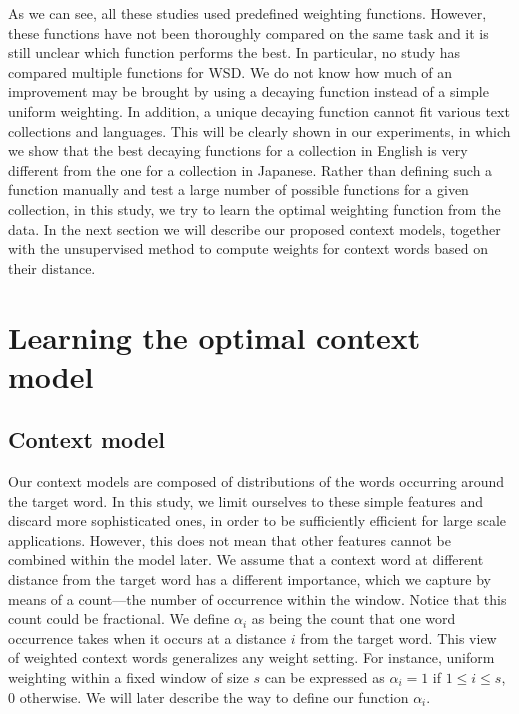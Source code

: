 \documentclass[english]{jnlp_1.4}
\begin{document}
As we can see, all these studies used predefined weighting functions.
However, these functions have not been thoroughly compared on the
same task and it is still unclear which function performs the best.
In particular, no study has compared multiple functions for WSD. We
do not know how much of an improvement may be brought by using a decaying
function instead of a simple uniform weighting. In addition, a unique
decaying function cannot fit various text collections and languages.
This will be clearly shown in our experiments, in which we show that
the best decaying functions for a collection in English is very different
from the one for a collection in Japanese. Rather than defi{}ning
such a function manually and test a large number of possible functions
for a given collection, in this study, we try to learn the optimal
weighting function from the data. In the next section we will describe
our proposed context models, together with the unsupervised method
to compute weights for context words based on their distance.


\section{Learning the optimal context model}
\label{sec:Learning-the-optimal}


\subsection{Context model}
\label{sub:ContextModelDefinition}

Our context models are composed of distributions of the words occurring
around the target word. In this study, we limit ourselves to these
simple features and discard more sophisticated ones, in order to be
sufficiently efficient for large scale applications. However, this
does not mean that other features cannot be combined within the model
later. We assume that a context word at different distance from the
target word has a different importance, which we capture by means
of a count---the number of occurrence within the window. Notice that
this count could be fractional. We define $\alpha_{i}$ as being the
count that one word occurrence takes when it occurs at a distance
$i$ from the target word. This view of weighted context words generalizes
any weight setting. For instance, uniform weighting within a fixed
window of size $s$ can be expressed as $\alpha_{i}=1$ if $1\leq i\leq s$,
0 otherwise. We will later describe the way to define our function
$\alpha_{i}$.
\end{document}
